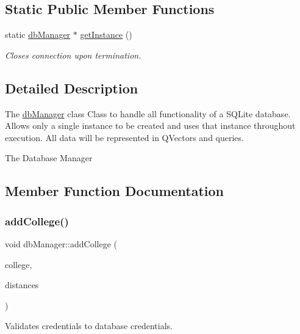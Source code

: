 \subsection*{Static Public Member Functions}
\begin{DoxyCompactItemize}
\item 
static \mbox{\hyperlink{classdb_manager}{db\+Manager}} $\ast$ \mbox{\hyperlink{classdb_manager_a0b96aeab4f66563db74711be1dfc1edb}{get\+Instance}} ()
\begin{DoxyCompactList}\small\item\em Closes connection upon termination. \end{DoxyCompactList}\end{DoxyCompactItemize}


\subsection{Detailed Description}
The \mbox{\hyperlink{classdb_manager}{db\+Manager}} class Class to handle all functionality of a S\+Q\+Lite database. Allows only a single instance to be created and uses that instance throughout execution. All data will be represented in Q\+Vectors and queries. 

The Database Manager 

\subsection{Member Function Documentation}
\mbox{\label{classdb_manager_ae466201599ce67617d769a1196714bf1}} 
\subsubsection{\texorpdfstring{add\+College()}{addCollege()}}
{\footnotesize\ttfamily void db\+Manager\+::add\+College (\begin{DoxyParamCaption}\item[{\mbox{\hyperlink{struct_college}{College}}}]{college,  }\item[{Q\+Vector$<$ \mbox{\hyperlink{struct_distance}{Distance}} $>$}]{distances }\end{DoxyParamCaption})}



Validates credentials to database credentials. 

